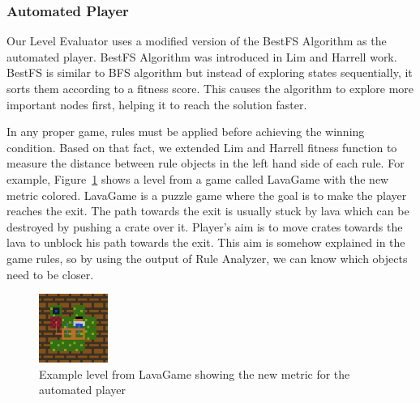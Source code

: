 \documentclass[letterpaper]{article}
\newcommand{\figref}[1]{Figure~\ref{Figure:#1}}
\begin{document}
\subsubsection{Automated Player}
Our Level Evaluator uses a modified version of the BestFS Algorithm as the automated player. BestFS Algorithm was introduced in Lim and Harrell work\cite{puzzleScriptGeneration}. BestFS is similar to BFS algorithm but instead of exploring states sequentially, it sorts them according to a fitness score. This causes the algorithm to explore more important nodes first, helping it to reach the solution faster.\\\par

In any proper game, rules must be applied before achieving the winning condition. Based on that fact, we extended Lim and Harrell fitness function to measure the distance between rule objects in the left hand side of each rule. For example, \figref{lavaGame} shows a level from a game called LavaGame with the new metric colored. LavaGame is a puzzle game where the goal is to make the player reaches the exit. The path towards the exit is usually stuck by lava which can be destroyed by pushing a crate over it. Player's aim is to move crates towards the lava to unblock his path towards the exit. This aim is somehow explained in the game rules, so by using the output of Rule Analyzer, we can know which objects need to be closer.

\begin{figure}[ht]
  	\centering
    \includegraphics[width=0.2\textwidth]{Images/lavaGame}
    \caption{Example level from LavaGame showing the new metric for the automated player}
    \label{Figure:lavaGame}
\end{figure}
\end{document}
